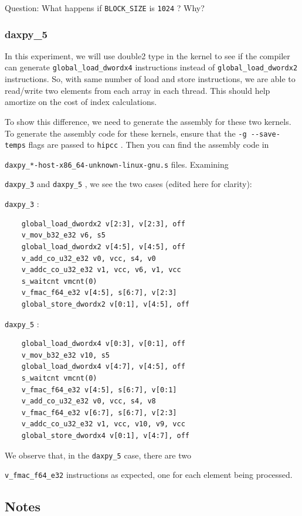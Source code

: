 \documentclass[
]{article}
\let\oldtexttt\texttt
\renewcommand{\texttt}[1]{
  \colorbox{Light}{\oldtexttt{#1}}
}
\begin{document}
Question: What happens if \texttt{BLOCK\_SIZE} is \texttt{1024}? Why?

\subsubsection{daxpy\_5}\label{daxpy_5}

In this experiment, we will use double2 type in the kernel to see if the
compiler can generate \texttt{global\_load\_dwordx4} instructions
instead of \texttt{global\_load\_dwordx2} instructions. So, with same
number of load and store instructions, we are able to read/write two
elements from each array in each thread. This should help amortize on
the cost of index calculations.

To show this difference, we need to generate the assembly for these two
kernels. To generate the assembly code for these kernels, ensure that
the \texttt{-g\ -\/-save-temps} flags are passed to \texttt{hipcc}. Then
you can find the assembly code in
\texttt{daxpy\_*-host-x86\_64-unknown-linux-gnu.s} files. Examining
\texttt{daxpy\_3} and \texttt{daxpy\_5}, we see the two cases (edited
here for clarity):

\texttt{daxpy\_3}:

\begin{verbatim}
    global_load_dwordx2 v[2:3], v[2:3], off
    v_mov_b32_e32 v6, s5
    global_load_dwordx2 v[4:5], v[4:5], off
    v_add_co_u32_e32 v0, vcc, s4, v0
    v_addc_co_u32_e32 v1, vcc, v6, v1, vcc
    s_waitcnt vmcnt(0)
    v_fmac_f64_e32 v[4:5], s[6:7], v[2:3]
    global_store_dwordx2 v[0:1], v[4:5], off
\end{verbatim}

\texttt{daxpy\_5}:

\begin{verbatim}
    global_load_dwordx4 v[0:3], v[0:1], off
    v_mov_b32_e32 v10, s5
    global_load_dwordx4 v[4:7], v[4:5], off
    s_waitcnt vmcnt(0)
    v_fmac_f64_e32 v[4:5], s[6:7], v[0:1]
    v_add_co_u32_e32 v0, vcc, s4, v8
    v_fmac_f64_e32 v[6:7], s[6:7], v[2:3]
    v_addc_co_u32_e32 v1, vcc, v10, v9, vcc
    global_store_dwordx4 v[0:1], v[4:7], off
\end{verbatim}

We observe that, in the \texttt{daxpy\_5} case, there are two
\texttt{v\_fmac\_f64\_e32} instructions as expected, one for each
element being processed.


\hypertarget{notes}{%
\subsection{Notes}\label{notes}}
\end{document}
